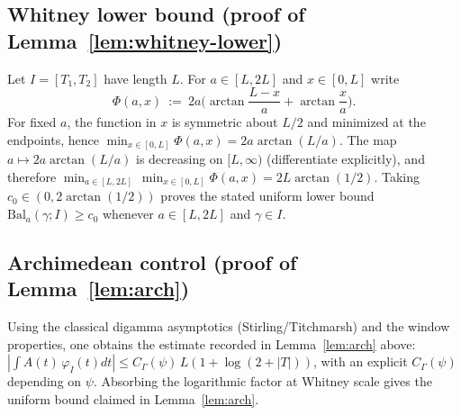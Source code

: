 \documentclass[11pt]{article}
\theoremstyle{remark}
\begin{document}
\subsection{Whitney lower bound (proof of Lemma~\ref{lem:whitney-lower})}
Let \(I=[T_1,T_2]\) have length \(L\). For \(a\in[L,2L]\) and \(x\in[0,L]\) write
\[
 \Phi(a,x)\ :=\ 2a\Big(\arctan\frac{L-x}{a}+\arctan\frac{x}{a}\Big).
\]
For fixed \(a\), the function in \(x\) is symmetric about \(L/2\) and minimized at the endpoints, hence
\(\min_{x\in[0,L]}\Phi(a,x)=2a\arctan(L/a)\). The map \(a\mapsto 2a\arctan(L/a)\) is decreasing on \([L,\infty)\) (differentiate explicitly), and therefore
\(\min_{a\in[L,2L]}\,\min_{x\in[0,L]}\Phi(a,x)=2L\arctan(1/2)\). Taking \(c_0\in(0,2\arctan(1/2))\) proves the stated uniform lower bound \(\mathrm{Bal}_a(\gamma;I)\ge c_0\) whenever \(a\in[L,2L]\) and \(\gamma\in I\).\qedhere

\subsection{Archimedean control (proof of Lemma~\ref{lem:arch})}
Using the classical digamma asymptotics (Stirling/Titchmarsh) and the window properties, one obtains the estimate recorded in Lemma~\ref{lem:arch} above: \(|\int A(t)\,\varphi_I(t)dt|\le C_\Gamma(\psi)\,L(1+\log(2+|T|))\), with an explicit \(C_\Gamma(\psi)\) depending on \(\psi\). Absorbing the logarithmic factor at Whitney scale gives the uniform bound claimed in Lemma~\ref{lem:arch}.\qedhere
\end{document}
